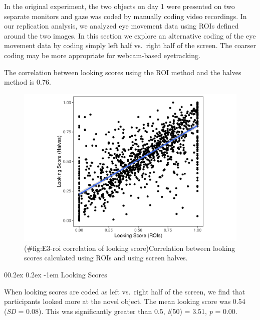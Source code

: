 \documentclass[
  man,floatsintext]{apa6}
\makeatletter
\let\oldparagraph\paragraph
\renewcommand{\paragraph}[1]{\oldparagraph{#1}\mbox{}}
\renewcommand{\paragraph}{\@startsection{paragraph}{4}{\parindent}%
  {0\baselineskip \@plus 0.2ex \@minus 0.2ex}%
  {-1em}%
  {\normalfont\normalsize\bfseries\itshape\typesectitle}}
\makeatother
\begin{document}
In the original experiment, the two objects on day 1 were presented on two separate monitors and gaze was coded by manually coding video recordings. In our replication analysis, we analyzed eye movement data using ROIs defined around the two images. In this section we explore an alternative coding of the eye movement data by coding simply left half vs.~right half of the screen. The coarser coding may be more appropriate for webcam-based eyetracking.

The correlation between looking scores using the ROI method and the halves method is 0.76.

\begin{figure}
\centering
\includegraphics{manuscript_files/figure-latex/E3-roi correlation of looking score-1.pdf}
\caption{(\#fig:E3-roi correlation of looking score)Correlation between looking scores calculated using ROIs and using screen halves.}
\end{figure}

\hypertarget{looking-scores}{%
\paragraph{Looking Scores}\label{looking-scores}}

When looking scores are coded as left vs.~right half of the screen, we find that participants looked more at the novel object. The mean looking score was 0.54 (\emph{SD} = 0.08). This was significantly greater than 0.5, \emph{t}(50) = 3.51, \emph{p} = 0.00.
\end{document}
